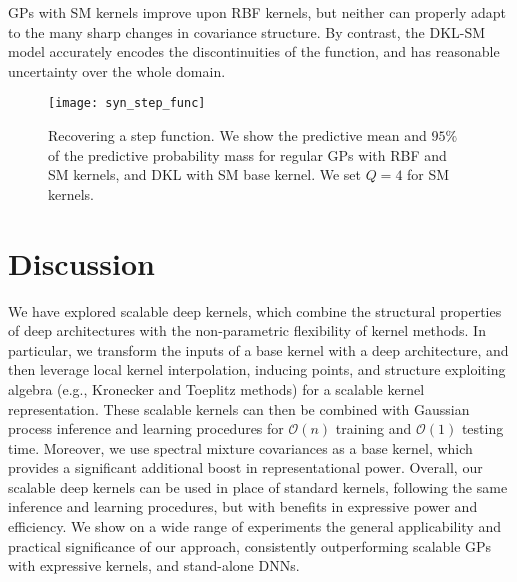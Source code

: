 \documentclass[twoside,11pt]{article}
\begin{document}
GPs with SM kernels improve upon RBF kernels, but neither can properly adapt to the many sharp changes in covariance structure.  By contrast, the DKL-SM model accurately encodes the discontinuities of the function, and has reasonable uncertainty over the whole domain.  


\begin{figure}[tb]

\centering
\texttt{[image: syn\_step\_func]}

  \caption{\small Recovering a step function. We show the predictive mean and $95\%$ of the predictive probability mass for regular GPs with RBF and SM kernels, and DKL with SM base kernel. We set $Q=4$ for SM kernels.}
  \label{fig:step}

\end{figure}

\section{Discussion}
\label{sec: discussion}

We have explored scalable deep kernels, which combine the structural properties of deep architectures with the non-parametric flexibility of kernel methods.   In particular, we transform the inputs of a base kernel with a deep architecture, and then leverage local kernel interpolation, inducing points, and structure exploiting algebra (e.g., Kronecker and Toeplitz methods) for a scalable kernel representation.   These scalable kernels can then be combined with Gaussian process inference and learning procedures for $\mathcal{O}(n)$ training and $\mathcal{O}(1)$ testing time.  Moreover, we use spectral mixture covariances as a base kernel, which provides a significant additional boost in representational power.  Overall, our scalable deep kernels can be used in place of standard kernels, following the same inference and learning procedures, but with benefits in expressive power and efficiency.   We show on a wide range of experiments the general applicability and practical significance of our approach, consistently outperforming scalable GPs with expressive kernels, and stand-alone DNNs.
\end{document}
